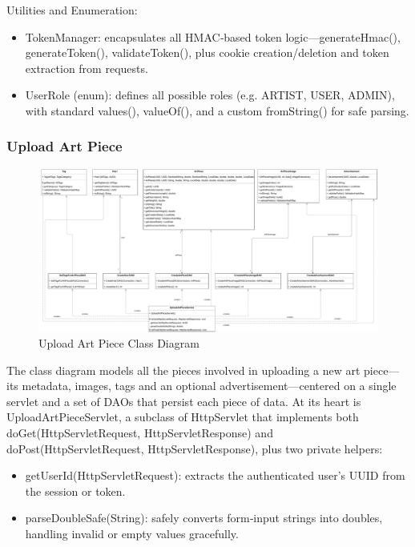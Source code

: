 Utilities and Enumeration:
\begin{itemize}
    \item TokenManager: encapsulates all HMAC‐based token logic—generateHmac(), generateToken(), validateToken(), plus cookie creation/deletion and token extraction from requests.
    \item UserRole (enum): defines all possible roles (e.g. ARTIST, USER, ADMIN), with standard values(), valueOf(), and a custom fromString() for safe parsing.
\end{itemize}

\subsubsection{Upload Art Piece}
\begin{figure}[H]
    \centering
    \includegraphics[width=\textwidth]{images/class_diagrams/UploadArtPiece_classdiagram.pdf}
    \caption{Upload Art Piece Class Diagram}
\end{figure}


The class diagram models all the pieces involved in uploading a new art piece—its metadata, images, tags and an optional advertisement—centered on a single servlet and a set of DAOs that persist each piece of data. At its heart is UploadArtPieceServlet, a subclass of HttpServlet that implements both doGet(HttpServletRequest, HttpServletResponse) and doPost(HttpServletRequest, HttpServletResponse), plus two private helpers:
\begin{itemize}
    \item getUserId(HttpServletRequest): extracts the authenticated user’s UUID from the session or token.
    \item parseDoubleSafe(String): safely converts form‐input strings into doubles, handling invalid or empty values gracefully.
\end{itemize}

